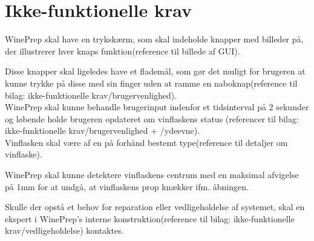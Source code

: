 \section{Ikke-funktionelle krav}
WinePrep skal have en trykskærm, som skal indeholde knapper med billeder på, der illustrerer hver knaps funktion(reference til billede af GUI).

Disse knapper skal ligeledes have et flademål, som gør det muligt for brugeren at kunne trykke på disse med sin finger uden at ramme en naboknap(reference til 
bilag: ikke-funktionelle krav/brugervenlighed).\\

WinePrep skal kunne behandle brugerinput indenfor et tidsinterval på 2 sekunder og løbende holde brugeren opdateret om vinflaskens status
(referencer til bilag: ikke-funktionelle krav/brugervenlighed + /ydeevne).\\

Vinflasken skal være af en på forhånd bestemt type(reference til detaljer om vinflaske).

WinePrep skal kunne detektere vinflaskens centrum med en maksimal afvigelse på 1mm for at undgå, at vinflaskens prop knækker ifm. åbningen.

Skulle der opstå et behov for reparation eller vedligeholdelse af systemet, skal en ekspert i WinePrep's interne konstruktion(reference til bilag: 
ikke-funktionelle krav/vedligeholdelse) kontaktes.
